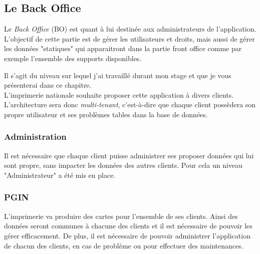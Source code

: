 
\subsection{Le Back Office}

Le \textit{Back Office} (BO) est quant à lui destinée aux administrateurs de l'application.
L'objectif de cette partie est de gérer les utilisateurs et droits, mais aussi de gérer les données "statiques" qui apparaitront dans la partie front office comme par exemple l'ensemble des supports disponibles.

Il s'agit du niveau sur lequel j'ai travaillé durant mon stage et que je vous présenterai dans ce chapitre.
\\

L'imprimerie nationale souhaite proposer cette application à divers clients.
L'architecture sera donc \textit{multi-tenant}, c'est-à-dire que chaque client possèdera son propre utilisateur et ses problèmes tables dans la base de données.


\subsubsection{Administration}

Il est nécessaire que chaque client puisse administrer ses proposer données qui lui sont propre, sans impacter les données des autres clients.
Pour cela un niveau "Administrateur" a été mis en place.


\subsubsection{PGIN}

L'imprimerie va produire des cartes pour l'ensemble de ses clients.
Ainsi des données seront communes à chacune des clients et il est nécessaire de pouvoir les gérer efficacement.
De plus, il est nécessaire de pouvoir administrer l'application de chacun des clients, en cas de problème ou pour effectuer des maintenances.

